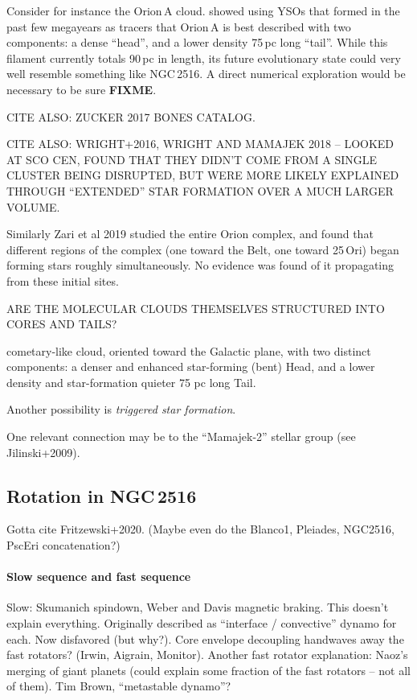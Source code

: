 \documentclass[12pt,twocolumn,tighten]{aastex63}
\newcommand{\cn}{NGC\,2516} %
\begin{document}
Consider for instance the Orion\,A cloud.  \citet{grosschedl_3d_2018} showed
using YSOs that formed in the past few megayears as tracers that Orion\,A is
best described with two components:
a dense ``head'', and a lower density 75\,pc long ``tail''.
While this filament currently totals 90\,pc in length, its future evolutionary state could very well resemble something like \cn.
A direct numerical exploration would be necessary to be sure {\bf FIXME}.

CITE ALSO: ZUCKER 2017 BONES CATALOG.

CITE ALSO: WRIGHT+2016, WRIGHT AND MAMAJEK 2018 -- LOOKED AT SCO CEN, FOUND
THAT THEY DIDN'T COME FROM A SINGLE CLUSTER BEING DISRUPTED, BUT WERE MORE
LIKELY EXPLAINED THROUGH ``EXTENDED'' STAR FORMATION OVER A MUCH LARGER VOLUME.

Similarly Zari et al 2019 studied the entire Orion complex, and found that
different regions of the complex (one toward the Belt, one toward 25\,Ori)
began forming stars roughly simultaneously. No evidence was found of it
propagating from these initial sites.

ARE THE MOLECULAR CLOUDS THEMSELVES STRUCTURED INTO CORES AND TAILS?


cometary-like cloud,
oriented toward the Galactic plane, with two distinct components:
a denser and enhanced star-forming (bent) Head, and a
lower density and star-formation quieter 75 pc long Tail.


Another possibility is {\it triggered star formation}.

One relevant connection may be to the ``Mamajek-2'' stellar group
(see Jilinski+2009).

\subsection{Rotation in NGC\,2516}

Gotta cite Fritzewski+2020.  (Maybe even do the Blanco1, Pleiades,
NGC2516, PscEri concatenation?)

  \paragraph{Slow sequence and fast sequence}
  Slow: Skumanich spindown, Weber and Davis magnetic braking.
  This doesn't explain everything.
  Originally described as ``interface / convective'' dynamo for each.
  Now disfavored (but why?).
  Core envelope decoupling handwaves away the fast rotators? (Irwin,
  Aigrain, Monitor).
  Another fast rotator explanation: Naoz's merging of giant planets
  (could explain some fraction of the fast rotators -- not all of them).
  Tim Brown, ``metastable dynamo''?
\end{document}

